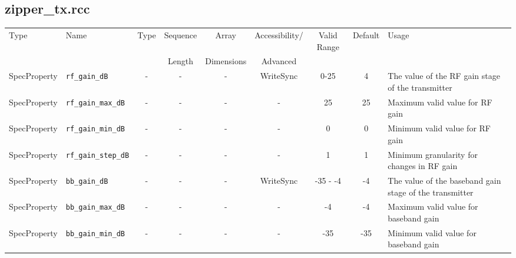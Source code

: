 \documentclass{article}
\def\comp{zipper\_tx}
\begin{document}
\begin{landscape}
	\subsection*{\comp.rcc}
	\begin{scriptsize}
		\begin{tabular}{|p{2cm}|p{4cm}|c|c|c|c|c|c|p{6.5cm}|}
			\hline
			\rowcolor{blue}
			Type         & Name                                & Type & Sequence & Array      & Accessibility/ & Valid Range  & Default & Usage                                                                                         \\
			\rowcolor{blue}
			             &                                     &      & Length   & Dimensions & Advanced       &              &         &                                                                                               \\
			\hline
			SpecProperty & \verb+rf_gain_dB+                   & -    & -        & -          & WriteSync      & 0-25         & 4       & The value of the RF gain stage of the transmitter                                             \\
			\hline
			SpecProperty & \verb+rf_gain_max_dB+               & -    & -        & -          & -              & 25           & 25      & Maximum valid value for RF gain                                                               \\
			\hline
			SpecProperty & \verb+rf_gain_min_dB+               & -    & -        & -          & -              & 0            & 0       & Minimum valid value for RF gain                                                               \\
			\hline
			SpecProperty & \verb+rf_gain_step_dB+              & -    & -        & -          & -              & 1            & 1       & Minimum granularity for changes in RF gain                                                    \\
			\hline
			SpecProperty & \verb+bb_gain_dB+                   & -    & -        & -          & WriteSync      & -35 - -4     & -4      & The value of the baseband gain stage of the transmitter                                       \\
			\hline
			SpecProperty & \verb+bb_gain_max_dB+               & -    & -        & -          & -              & -4           & -4      & Maximum valid value for baseband gain                                                         \\
			\hline
			SpecProperty & \verb+bb_gain_min_dB+               & -    & -        & -          & -              & -35          & -35     & Minimum valid value for baseband gain                                                         \\

\end{tabular}
\end{scriptsize}
\end{landscape}
\end{document}
